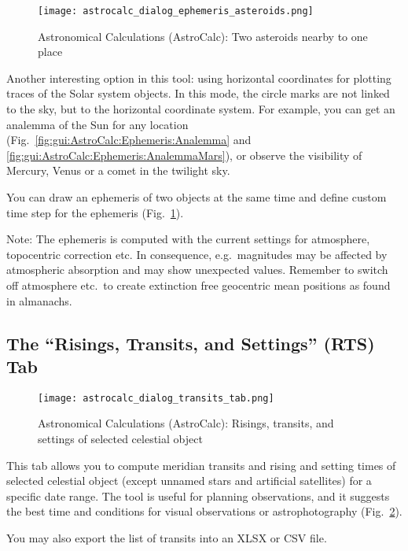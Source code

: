 \begin{figure}[p]
	\centering\texttt{[image: astrocalc\_dialog\_ephemeris\_asteroids.png]}
	\caption{Astronomical Calculations (AstroCalc): Two asteroids nearby to one place}
	\label{fig:gui:AstroCalc:Ephemeris:Asteroids}
\end{figure}

Another interesting option in this tool: using horizontal coordinates for plotting traces of the Solar system objects. 
In this mode, the circle marks are not linked to the sky, but to the horizontal coordinate system.
For example, you can get an analemma of the Sun for any location (Fig.~\ref{fig:gui:AstroCalc:Ephemeris:Analemma}
and \ref{fig:gui:AstroCalc:Ephemeris:AnalemmaMars}), 
or observe the visibility of Mercury, Venus or a comet in the twilight sky.

You can   draw an ephemeris of 
two objects at the same time and define custom time step for the ephemeris 
(Fig.~\ref{fig:gui:AstroCalc:Ephemeris:Asteroids}).

Note: The ephemeris is computed with the current settings for atmosphere, topocentric correction etc. 
In consequence, e.g.\ magnitudes may be affected by atmospheric absorption and may show unexpected values. 
Remember to switch off atmosphere etc.\ to create extinction free geocentric mean positions as found in almanachs.

\subsection{The ``Risings, Transits, and Settings'' (RTS) Tab}
\label{sec:gui:AstroCalc:RTS}

\begin{figure}[htbp]
	\centering\texttt{[image: astrocalc\_dialog\_transits\_tab.png]}
	\caption{Astronomical Calculations (AstroCalc): Risings, transits, and settings of selected celestial object}
	\label{fig:gui:AstroCalc:RTS}
\end{figure}

\noindent This  tab allows you to compute meridian transits and
 rising and setting times of selected celestial object 
(except unnamed stars and artificial satellites) for a specific date range. 
The tool is useful for planning observations, and it suggests the best time and conditions 
for visual observations or astrophotography (Fig.~\ref{fig:gui:AstroCalc:RTS}). 

You may also export the list of transits into an XLSX or CSV file.

